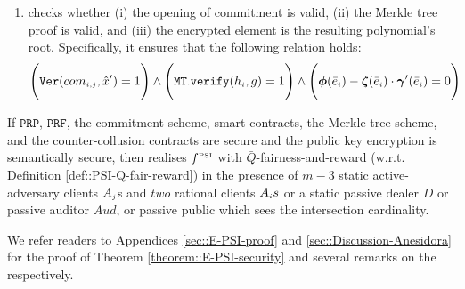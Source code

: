 \begin{enumerate}[leftmargin=5mm]
\begin{enumerate}[leftmargin=2.4mm]
 \item\label{e-psi::SC-verification--check-three-vals} checks whether (i) the opening of commitment is valid,  (ii) the Merkle tree proof is valid, and (iii) the encrypted element is the resulting polynomial's root. Specifically, it ensures that the following relation holds: 
$$\Bigg(\mathtt{Ver}(com_{\scriptscriptstyle i,j}, \hat{x}')=1\Bigg)  \wedge  \Bigg(\mathtt{MT.verify}(h_{\scriptscriptstyle i},g)=1\Bigg) \wedge  \Bigg(\bm\phi( \bar{e}_{\scriptscriptstyle i})-\bm\zeta( \bar{e}_{\scriptscriptstyle i})\cdot \bm\gamma'( \bar{e}_{\scriptscriptstyle i})=0\Bigg)$$




\end{enumerate}




\end{enumerate}



 \begin{theorem}\label{theorem::E-PSI-security}
If  $\mathtt{PRP}$, $\mathtt{PRF}$, the commitment scheme, smart contracts, the Merkle tree scheme, \fpsi and the counter-collusion contracts are secure and the public key encryption is semantically secure,  then  \epsi realises  $f^{\scriptscriptstyle \text{PSI}}$ with $\bar Q$-fairness-and-reward (w.r.t. Definition \ref{def::PSI-Q-fair-reward}) in the presence of $m-3$ static active-adversary clients $A_{\scriptscriptstyle j}$s and $two$ rational clients $A_{\scriptscriptstyle i}s$ or a static passive dealer $D$ or passive auditor $Aud$, or passive public which sees the intersection cardinality.
 \end{theorem}


We refer readers to Appendices \ref{sec::E-PSI-proof} and \ref{sec::Discussion-Anesidora} for the proof of Theorem \ref{theorem::E-PSI-security} and several remarks on the \epsi respectively. 
%








